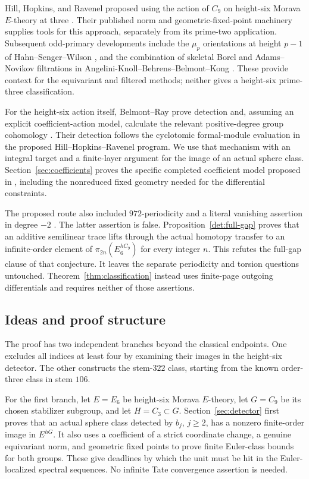 \documentclass[11pt]{article}
\theoremstyle{definition}
\theoremstyle{remark}
\numberwithin{equation}{section}
\begin{document}
Hill, Hopkins, and Ravenel proposed using the action of $C_9$ on height-six Morava $E$-theory at three \cite{HHR2011}. Their published norm and geometric-fixed-point machinery \cite{HHR2016} supplies tools for this approach, separately from its prime-two application. Subsequent odd-primary developments include the $\mu_p$ orientations at height $p-1$ of Hahn--Senger--Wilson \cite{HahnSengerWilson}, and the combination of skeletal Borel and Adams--Novikov filtrations in Angelini-Knoll--Behrens--Belmont--Kong \cite{AKBBK}. These provide context for the equivariant and filtered methods; neither gives a height-six prime-three classification.

For the height-six action itself, Belmont--Ray prove detection \cite[Proposition~0.2]{BR} and, assuming an explicit coefficient-action model, calculate the relevant positive-degree group cohomology \cite[Theorem~0.6]{BR}. Their detection follows the cyclotomic formal-module evaluation in the proposed Hill--Hopkins--Ravenel program. We use that mechanism with an integral target and a finite-layer argument for the image of an actual sphere class. Section~\ref{sec:coefficients} proves the specific completed coefficient model proposed in \cite[Conjecture~0.3]{BR}, including the nonreduced fixed geometry needed for the differential constraints.

The proposed route also included $972$-periodicity and a literal vanishing assertion in degree $-2$ \cite[Conjecture~0.1]{BR}. The latter assertion is false. Proposition~\ref{det:full-gap} proves that an additive semilinear trace lifts through the actual homotopy transfer to an infinite-order element of $\pi_{2n}(E_6^{hC_9})$ for every integer $n$. This refutes the full-gap clause of that conjecture. It leaves the separate periodicity and torsion questions untouched. Theorem~\ref{thm:classification} instead uses finite-page outgoing differentials and requires neither of those assertions.

\subsection{Ideas and proof structure}

The proof has two independent branches beyond the classical endpoints. One excludes all indices at least four by examining their images in the height-six detector. The other constructs the stem-$322$ class, starting from the known order-three class in stem $106$.

For the first branch, let $E=E_6$ be height-six Morava $E$-theory, let $G=C_9$ be its chosen stabilizer subgroup, and let $H=C_3\subset G$. Section~\ref{sec:detector} first proves that an actual sphere class detected by $b_j$, $j\geq2$, has a nonzero finite-order image in $E^{hG}$. It also uses a coefficient of a strict coordinate change, a genuine equivariant norm, and geometric fixed points to prove finite Euler-class bounds for both groups. These give deadlines by which the unit must be hit in the Euler-localized spectral sequences. No infinite Tate convergence assertion is needed.
\end{document}
